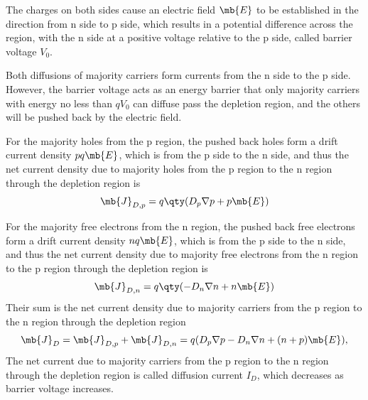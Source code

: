 \documentclass[a4paper,12pt]{report}
\begin{document}
The charges on both sides cause an electric field $\mb{E}$ to be established in the direction from n side to p side, which results in a potential difference across the region, with the n side at a positive voltage relative to the p side, called barrier voltage $V_0$.

Both diffusions of majority carriers form currents from the n side to the p side. However, the barrier voltage acts as an energy barrier that only majority carriers with energy no less than $qV_0$ can diffuse pass the depletion region, and the others will be pushed back by the electric field.
\bit
\item For the majority holes from the p region, the pushed back holes form a drift current density $pq\mb{E}$, which is from the p side to the n side, and thus the net current density due to majority holes from the p region to the n region through the depletion region is
\[\mb{J}_{D,p}=q\qty(D_p\nabla p+p\mb{E})\]
\item For the majority free electrons from the n region, the pushed back free electrons form a drift current density $nq\mb{E}$, which is from the p side to the n side, and thus the net current density due to majority free electrons from the n region to the p region through the depletion region is
\[\mb{J}_{D,n}=q\qty(-D_n\nabla n+n\mb{E})\]
\eit
Their sum is the net current density due to majority carriers from the p region to the n region through the depletion region
\[\mb{J}_D=\mb{J}_{D,p}+\mb{J}_{D,n}=q(D_p\nabla p-D_n\nabla n+(n+p)\mb{E}),\]
The net current due to majority carriers from the p region to the n region through the depletion region is called diffusion current $I_D$, which decreases as barrier voltage increases.
\end{document}

